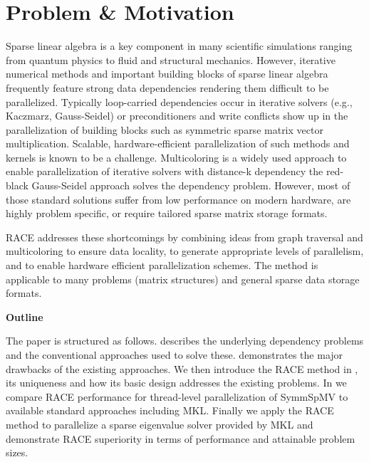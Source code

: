 	
\section{Problem \& Motivation}
	Sparse linear algebra is a key component in many scientific simulations
	ranging from quantum physics to fluid and structural mechanics.
	However, iterative numerical methods  
	and important building blocks of sparse linear algebra frequently feature strong 
	data dependencies rendering them difficult to be parallelized.
	Typically loop-carried dependencies occur in
	iterative solvers  (e.g., Kaczmarz, Gauss-Seidel) or preconditioners 
	and write conflicts show up in the parallelization of building blocks such 
	as symmetric sparse matrix vector multiplication.
	Scalable, hardware-efficient parallelization of such methods and kernels is known to be a 
	challenge. Multicoloring is a widely used approach to enable parallelization
	of iterative solvers with distance-k dependency \eg the 
	red-black Gauss-Seidel approach solves the \DONE dependency problem.
	However, most of those standard solutions suffer from low performance
	on modern hardware, are highly problem specific, or require tailored
    sparse matrix storage formats.

	\Acrshort{RACE} addresses these shortcomings by combining ideas from graph traversal
	and multicoloring to ensure data locality, to generate appropriate levels of parallelism,
	and to enable hardware efficient parallelization schemes. The method is applicable
	to many problems (\ie matrix structures) and general sparse data storage formats.
	

\noindent\textbf{Outline}


\noindent	The paper is structured as follows.  describes
	the underlying dependency problems and the conventional
	approaches used to solve these.  
	demonstrates the major drawbacks of the existing 
	approaches. We then introduce the \acrshort{RACE} method in ,
	its uniqueness and how its basic design addresses the existing problems. 
	In  we compare \acrshort{RACE} performance for thread-level parallelization of \acrfull{SymmSpMV} to
	available standard approaches including \acrshort{MKL}. Finally we apply the \acrshort{RACE}
	method to parallelize a sparse eigenvalue solver provided by \acrshort{MKL} and demonstrate  \acrshort{RACE} superiority in terms of performance and attainable problem sizes. 
		
